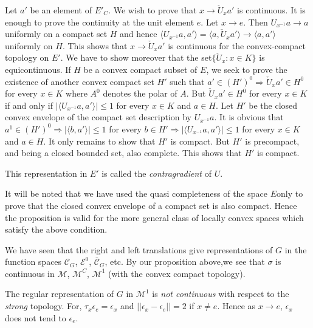 Let $a'$ be an element of $E'_C$. We wish to prove that $x\rightarrow
\check{U}_x a'$ is continuous. It is enough to prove the continuity at
the unit element $e$. Let $x \rightarrow e$. Then $U_{x^{-1}} a\rightarrow
a$ uniformly on a compact set $H$ and hence $\langle U_{x^{-1}}a,a'\rangle
= \langle a,\check{U}_x a'\rangle \rightarrow \langle a,a' \rangle$
uniformly on $H$. This shows that $x \rightarrow \check{U}_x a'$ is
continuous for the convex-compact topology on $E'$. We have to show
moreover that the set$\{\check{U}_x : x\in K \}$ is
equicontinuous. If $H$ be a convex compact subset of $E$, we seek to
prove the existence of another convex compact set $H'$ such that
$a' \in (H')^0 \Rightarrow \check{U}_xa' \in H^0$ for every
$x\in K$ where $A^{0}$ denotes the polar of $A$. But
$\check{U}_{x}a'\in H^{0}$ for every $x\in K$ if and only if $\Big
|\langle U_{x^{-1}} a,a' \rangle \Big|\leq 1$ 
for every $x\in K$ and $a \in H$. Let $H'$ be the closed convex
envelope of the compact set description by $U_{x^{-1}}a$. It is obvious
that $a^1 \in (H')^0 \Rightarrow \big| \langle b,a' \rangle \big|
\leq 1$ for every $b\in H' \Rightarrow \big| \langle U_{x^{-1}}a,a'
\rangle \big|\leq 1$ for every $x\in K$ and $a\in H$. It only remains
to show that $H'$ is compact. But $H'$ is precompact, and being a
closed bounded set, also complete. This shows that $H'$ is compact. 

This representation in $E'$ is called the \textit{contragradient} of $U$.

\begin{remark*}%
 It will be noted that we have used the quasi completeness of the space
 $E$\pageoriginale only to prove that the closed  convex  envelope  of
 a compact 
 set is also  compact. Hence the proposition  is valid for  the more 
 general class of locally convex spaces which satisfy the above
 condition. 
\end{remark*}
 
\begin{example*}
 We have seen that the right and left  translations give
 representations  of $G$  in the function spaces
 $\mathscr{C}_{G}$, $\mathscr{E}^{0}$, $\bar{\mathscr{C}}_{G}$,
 etc. By our proposition above,we see that $\sigma$ is continuous 
 in $\mathscr{M}$, $\mathscr{M}^{C}$, $\mathscr{M}^{1}$ 
(with the convex compact topology).
\end{example*}
 
\begin{remark*}
The regular  representation of $G$ in $\mathscr{M}^1$ is {\em not continuous}
with respect  to the {\em strong} topology. For,  
 $\tau_{x} \epsilon_{e} = \epsilon_{x}$ and $|| \epsilon_{x}
-\epsilon_{e}|| = 2$ if $x\neq  e$. Hence as $x \rightarrow e$,
$\epsilon_{x}$ does not tend to $\epsilon_{e}$. 
\end{remark*}
 
